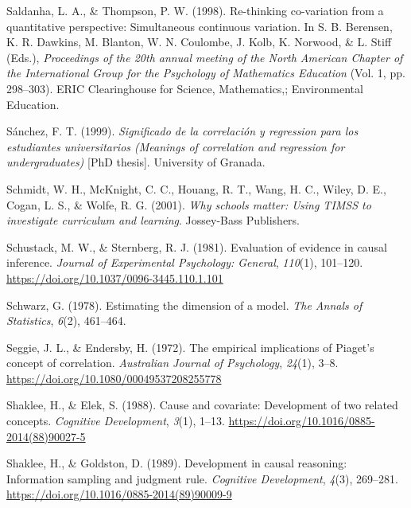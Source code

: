 \documentclass[11pt]{umnthesis}
\newlength{\cslhangindent}
\newenvironment{CSLReferences}[2] %
 {%
  \setlength{\parindent}{0pt}
  \ifodd #1 \everypar{\setlength{\hangindent}{\cslhangindent}}\ignorespaces\fi
  \ifnum #2 > 0
  \setlength{\parskip}{#2\baselineskip}
  \fi
 }%
 {}
\begin{document}
\begin{CSLReferences}{1}{0}
\leavevmode{}%
Saldanha, L. A., \& Thompson, P. W. (1998). Re-thinking co-variation from a quantitative perspective: Simultaneous continuous variation. In S. B. Berensen, K. R. Dawkins, M. Blanton, W. N. Coulombe, J. Kolb, K. Norwood, \& L. Stiff (Eds.), \emph{{Proceedings of the 20th annual meeting of the North American Chapter of the International Group for the Psychology of Mathematics Education}} (Vol. 1, pp. 298--303). ERIC Clearinghouse for Science, Mathematics,; Environmental Education.

\leavevmode{}%
Sánchez, F. T. (1999). \emph{Significado de la correlación y regression para los estudiantes universitarios ({M}eanings of correlation and regression for undergraduates)} {[}PhD thesis{]}. University of Granada.

\leavevmode{}%
Schmidt, W. H., McKnight, C. C., Houang, R. T., Wang, H. C., Wiley, D. E., Cogan, L. S., \& Wolfe, R. G. (2001). \emph{Why schools matter: Using {TIMSS} to investigate curriculum and learning}. Jossey-Bass Publishers.

\leavevmode{}%
Schustack, M. W., \& Sternberg, R. J. (1981). Evaluation of evidence in causal inference. \emph{Journal of Experimental Psychology: General}, \emph{110}(1), 101--120. \url{https://doi.org/10.1037/0096-3445.110.1.101}

\leavevmode{}%
Schwarz, G. (1978). Estimating the dimension of a model. \emph{The Annals of Statistics}, \emph{6}(2), 461--464.

\leavevmode{}%
Seggie, J. L., \& Endersby, H. (1972). The empirical implications of {P}iaget's concept of correlation. \emph{Australian Journal of Psychology}, \emph{24}(1), 3--8. \url{https://doi.org/10.1080/00049537208255778}

\leavevmode{}%
Shaklee, H., \& Elek, S. (1988). Cause and covariate: Development of two related concepts. \emph{Cognitive Development}, \emph{3}(1), 1--13. \url{https://doi.org/10.1016/0885-2014(88)90027-5}

\leavevmode{}%
Shaklee, H., \& Goldston, D. (1989). Development in causal reasoning: Information sampling and judgment rule. \emph{Cognitive Development}, \emph{4}(3), 269--281. \url{https://doi.org/10.1016/0885-2014(89)90009-9}


\end{CSLReferences}
\end{document}
